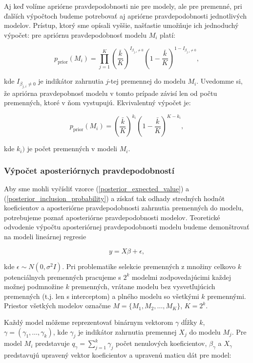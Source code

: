 Aj keď volíme apriórne pravdepodobnosti nie pre modely, ale pre premenné,
pri ďalších výpočtoch budeme potrebovať aj apriórne pravdepodobnosti jednotlivých modelov.
Prístup, ktorý sme opísali vyššie, našťastie umožňuje ich jednoduchý výpočet: pre apriórnu pravdepodobnosť modelu \(M_i\) platí:

\[
p_{\text{prior}}(M_i) = \prod_{j = 1}^K \left( \frac{\bar{k}}{K} \right)^{I_{\beta_{j, i} \neq 0}} \left( 1 - \frac{\bar{k}}{K} \right)^{1 - I_{\beta_{j, i} \neq 0}},
\]

kde \( I_{\beta_{j, i} \neq 0} \) je indikátor zahrnutia \(j\)-tej premennej do modelu \(M_i\).
Uvedomme si, že apriórna pravdepobnosť modelu v tomto prípade závisí len od počtu premenných, ktoré v ňom vystupujú.
Ekvivalentný výpočet je:

\[
p_{\text{prior}}(M_i) = \left( \frac{\bar{k}}{K} \right)^{k_i} \left( 1 - \frac{\bar{k}}{K} \right)^{K - k_i},
\]

kde \( k_i) \) je počet premenných v modeli \( M_i \).

\subsubsection{Výpočet aposteriórnych pravdepodobností}

Aby sme mohli vyčísliť vzorce (\ref{posterior_expected_value}) a (\ref{posterior_inclusion_probability}) a získať tak odhady stredných hodnôt koeficientov a aposteriórne pravdepodobnosti zahrnutia premenných do modelu,
potrebujeme poznať aposteriórne pravdepodobnosti modelov.
Teoretické odvodenie výpočtu aposteriórnej pravdepodobnosti modelu budeme demonštrovať na modeli lineárnej regresie

\begin{equation} \label{linear_regression}
y = X \beta + \epsilon,
\end{equation}

kde \( \epsilon \sim N(0, \sigma^2 I) \).
Pri problematike selekcie premenných z množiny celkovo \(k\) potenciálnych premenných pracujeme s \(2^k\) modelmi zodpovedajúcimi každej možnej podmnožine \(k\) premenných,
vrátane modelu bez vysvetľujúcich premenných (t.j. len s interceptom) a plného modelu so všetkými \(k\) premennými.
Priestor všetkých modelov označme \(M = \{ M_1, M_2, \ldots, M_K \} \), \(K = 2^k\).

Každý model môžeme reprezentovať binárnym vektorom \(\gamma\) dĺžky \(k\), \( \gamma = (\gamma_1, \ldots, \gamma_k) \), kde \( \gamma_j \) je indikátor zahrnutia premennej \(X_j\) do modelu \(M_j\).
Pre model \(M_i\) predstavuje \( q_{\gamma} = \sum_{j=1}^k \gamma_j \) počet nenulových koeficientov, \(\beta_{\gamma} \) a \( X_{\gamma} \) predstavujú upravený vektor koeficientov a upravenú maticu dát pre model:

